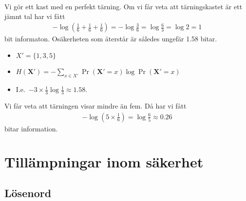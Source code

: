 \documentclass{beamer}
\let\stoch\mathbf{}
\begin{document}
\begin{frame}
  \begin{example}
    Vi gör ett kast med en perfekt tärning.
    Om vi får veta att tärningskastet är ett jämnt tal har vi fått
    \begin{align*}
      -\log\left( \frac{1}{6} + \frac{1}{6} + \frac{1}{6}\right) =
      -\log\frac{3}{6} = \log\frac{6}{3} = \log 2 = 1
    \end{align*}
    bit informaton.
    Osäkerheten som återstår är således ungefär 1.58 bitar.
  \end{example}

  \pause{}

  \begin{remark}
    \begin{itemize}
      \item \(X' = \{1, 3, 5\}\)
      \item \(H(\stoch X') = - \sum_{x\in X'} \Pr(\stoch X' = x)\log \Pr(\stoch 
          X' = x)\)
      \item I.e.\ \(- 3 \times \frac{1}{3}\log\frac{1}{3} \approx 1.58\).
    \end{itemize}
  \end{remark}
\end{frame}

\begin{frame}
  \begin{example}
    Vi får veta att tärningen visar mindre än fem.
    Då har vi fått
    \begin{align*}
      -\log\left( 5\times\frac{1}{6}\right) = \log\frac{6}{5}\approx 0.26
    \end{align*}
    bitar information.
  \end{example}
\end{frame}


\section[Tillämpningar]{Tillämpningar inom säkerhet}

\subsection{Lösenord}
\end{document}
